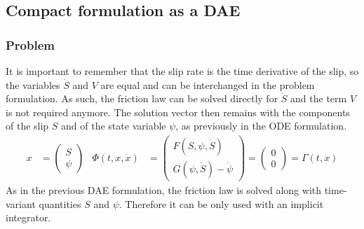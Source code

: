 \subsection{Compact formulation as a DAE}
\label{ssec:444SEAS__compactDAE}
\subsubsection{Problem}
It is important to remember that the slip rate is the time derivative of the slip, so the variables $\dot{S}$ and $V$ are equal and can be interchanged in the problem formulation. As such, the friction law can be solved directly for $\dot{S}$ and the term $V$ is not required anymore. The solution vector then remains with the components of the slip $S$ and of the state variable $\psi$, as previously in the ODE formulation.
 \begin{align}
	\label{eq:DAE_compact_formulation_SEAS}
	x &= \begin{pmatrix}
			S \\ \psi
	     \end{pmatrix} & \Phi(t, x,\dot{x}) &= \begin{pmatrix}
												F(S,\psi,\dot{S}) \\ G(\psi, \dot{S}) - \dot{\psi}
											\end{pmatrix} = \begin{pmatrix}
																0 \\ 0
															\end{pmatrix} = \Gamma(t,x)
\end{align}
As in the previous DAE formulation, the friction law is solved along with time-variant quantities $S$ and $\psi$. Therefore it can be only used with an implicit integrator. \\

